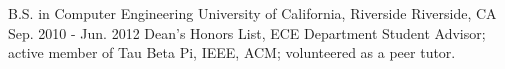 

\begin{cventries}

  \cventry
    {B.S. in Computer Engineering} %
    {University of California, Riverside} %
    {Riverside, CA} %
    {Sep. 2010 - Jun. 2012} %
    {Dean's Honors List, ECE Department Student Advisor; active member of Tau Beta Pi, IEEE, ACM; volunteered as a peer tutor.} %
    {}
\end{cventries}
